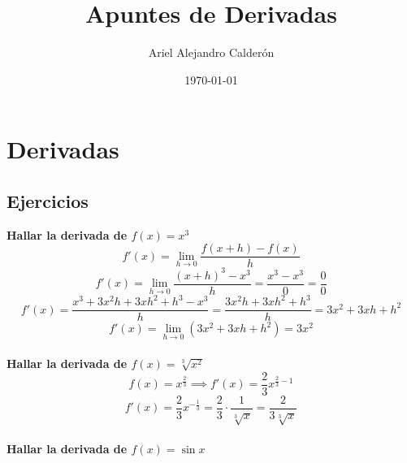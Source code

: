 \documentclass[12pt,a4paper,fleqn]{article}
\title{Apuntes de Derivadas}
\author{Ariel Alejandro Calderón}
\date{\today}
\begin{document}
\maketitle

\newpage
\tableofcontents
\newpage

\section{Derivadas}
\subsection{Ejercicios}

\textbf{Hallar la derivada de $f(x)=x^3$}
\begin{equation*}
	f'(x) = \lim_{h \to 0} \dfrac{f(x+h) - f(x)}{h}
\end{equation*}
\begin{equation*}
	f'(x) = \lim_{h \to 0} \dfrac{(x+h)^3 - x^3}{h} = \dfrac{x^3 - x^3}{0} = \dfrac{0}{0}
\end{equation*}
\begin{equation*}
	f'(x) = \dfrac{x^3 + 3x^2h + 3xh^2 + h^3 - x^3}{h} = \dfrac{3x^2h + 3xh^2 + h^3}{h} = 3x^2 + 3xh + h^2
\end{equation*}
\begin{equation*}
	f'(x) = \lim_{h \to 0} (3x^2 + 3xh + h^2) = 3x^2
\end{equation*}\\[10pt]
\textbf{Hallar la derivada de $f(x)=\sqrt[3]{x^2}$}
\begin{equation*}
	f(x) = x^{\frac{2}{3}} \implies f'(x)= \frac{2}{3}x^{\frac{2}{3}-1}
\end{equation*}
\begin{equation*}
	f'(x)= \frac{2}{3}x^{-\frac{1}{3}}=\frac{2}{3}\cdot\frac{1}{\sqrt[3]{x}}=\frac{2}{3\sqrt[3]{x}}
\end{equation*}\\[10pt]
\textbf{Hallar la derivada de $f(x)= \sin x$}\\[10pt]
\end{document}
